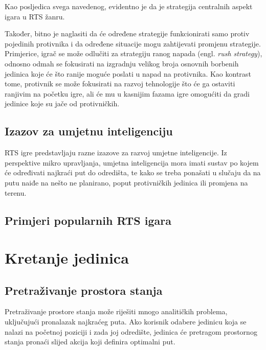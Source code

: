 \documentclass[times, utf8, zavrsni, numeric]{fer}
\begin{document}
\par Kao posljedica svega navedenog, evidentno je da je strategija centralnih aspekt igara u RTS žanru. 

\par Također, bitno je naglasiti da će određene strategije funkcionirati samo protiv pojedinih protivnika i da određene situacije mogu zahtijevati promjenu strategije. 
Primjerice, igrač se može odlučiti za strategiju ranog napada (engl. \textit{rush strategy}), odnosno odmah se fokusirati na izgradnju velikog broja osnovnih borbenih jedinica koje će što ranije moguće poslati u napad na protivnika.
Kao kontrast tome, protivnik se može fokusirati na razvoj tehnologije što će ga ostaviti ranjivim na početku igre, ali će mu u kasnijim fazama igre omogućiti da gradi jedinice koje su jače od protivničkih.

\section{Izazov za umjetnu inteligenciju}

\par RTS igre predstavljaju razne izazove za razvoj umjetne inteligencije. 
Iz perspektive mikro upravljanja, umjetna inteligencija mora imati sustav po kojem će određivati najkraći put do odredišta, te kako se treba ponašati u slučaju da na putu naiđe na nešto ne planirano, poput protivničkih jedinica ili promjena na terenu.


\section{Primjeri popularnih RTS igara}

\chapter{Kretanje jedinica}\label{ch:pathfinding}

\section{Pretraživanje prostora stanja}
\par Pretraživanje prostore stanja može riješiti mnogo analitičkih problema, uključujući pronalazak najkraćeg puta. 
Ako korisnik odabere jedinicu koja se nalazi na početnoj poziciji i zada joj odredište, jedinica će pretragom prostornog stanja pronaći slijed akcija koji definira optimalni put.
\end{document}

